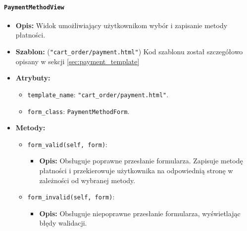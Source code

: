 \documentclass[12pt,a4paper,oneside]{article}
\theoremstyle{definition}
\numberwithin{equation}{section}
\begin{document}
\paragraph{\texttt{PaymentMethodView}}
\begin{itemize}
    \item \textbf{Opis:} Widok umożliwiający użytkownikom wybór i zapisanie metody płatności.
    \item \textbf{Szablon:}
        (\texttt{"cart\_order/payment.html"})
        \subsubitem Kod szablonu został szczegółowo opisany w sekcji \ref{sec:payment_template}
    \item \textbf{Atrybuty:}
    \begin{itemize}
        \item \texttt{template\_name}: \texttt{"cart\_order/payment.html"}.
        \item \texttt{form\_class}: \texttt{PaymentMethodForm}.
    \end{itemize}
    \item \textbf{Metody:}
    \begin{itemize}
        \item \texttt{form\_valid(self, form)}:
        \begin{itemize}
            \item \textbf{Opis:} Obsługuje poprawne przesłanie formularza. Zapisuje metodę płatności i przekierowuje użytkownika na odpowiednią stronę w zależności od wybranej metody.
        \end{itemize}
        \item \texttt{form\_invalid(self, form)}:
        \begin{itemize}
            \item \textbf{Opis:} Obsługuje niepoprawne przesłanie formularza, wyświetlając błędy walidacji.
        \end{itemize}
    \end{itemize}
\end{itemize}
\end{document}
